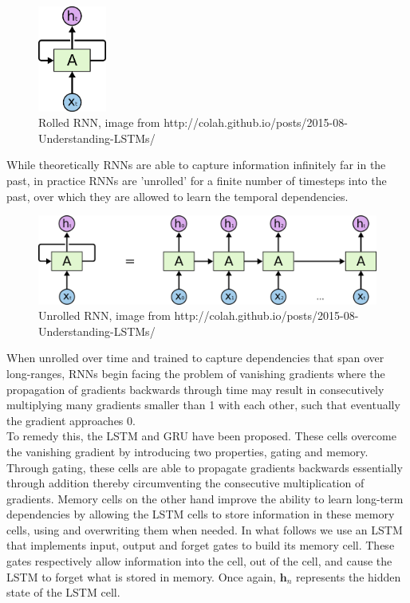  \begin{figure}
     \centering
     \includegraphics[width=0.2\textwidth]{images/RNN-rolled.png}
     \caption{Rolled RNN, image from http://colah.github.io/posts/2015-08-Understanding-LSTMs/}
     \label{rolled_rnn}
 \end{figure}

 While theoretically RNNs are able to capture information infinitely far in the past, in practice RNNs are 'unrolled' for a finite number of timesteps into the past, over which they are allowed to learn the temporal dependencies. 

 \begin{figure}
     \centering
     \includegraphics[width=1\textwidth]{images/RNN-unrolled.png}
     \caption{Unrolled RNN, image from http://colah.github.io/posts/2015-08-Understanding-LSTMs/}
     \label{unrolled_rnn}
 \end{figure}

 When unrolled over time and trained to capture dependencies that span over long-ranges, RNNs begin facing the problem of vanishing gradients where the propagation of gradients backwards through time may result in consecutively multiplying many gradients smaller than 1 with each other, such that eventually the gradient approaches 0.\\

 To remedy this, the LSTM \citep{Hochreiter1997} and GRU \citep{Cho2014} have been proposed. These cells overcome the vanishing gradient by introducing two properties, gating and memory. Through gating, these cells are able to propagate gradients backwards essentially through addition thereby circumventing the consecutive multiplication of gradients. Memory cells on the other hand improve the ability to learn long-term dependencies by allowing the LSTM cells to store information in these memory cells, using and overwriting them when needed. In what follows we use an LSTM that implements input, output and forget gates to build its memory cell. These gates respectively allow information into the cell, out of the cell, and cause the LSTM to forget what is stored in memory. Once again, $\mathbf{h}_n$ represents the hidden state of the LSTM cell.

